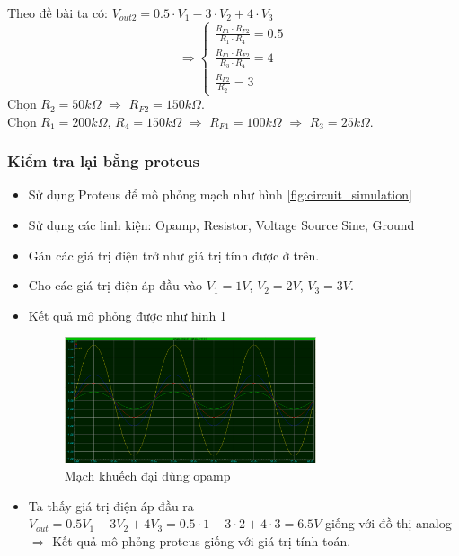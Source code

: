 				\hspace*{0.6cm}Theo đề bài ta có: $V_{out2} = 0.5 \cdot V_1 - 3 \cdot V_2 + 4 \cdot V_3$
				\[
				\Rightarrow
				\begin{cases}
					\frac{R_{F1} \cdot R_{F2}}{R_1 \cdot R_4} = 0.5\\
					\frac{R_{F1} \cdot R_{F2}}{R_3 \cdot R_4} = 4\\
					\frac{R_{F2}}{R_2} = 3
				\end{cases}
				\]
				\hspace*{0.6cm}Chọn $R_{2} = 50k\Omega$ $\Rightarrow$ $R_{F2} = 150k\Omega$.\\
				\hspace*{0.6cm}Chọn $R_{1} = 200k\Omega$, $R_{4} = 150k\Omega$ $\Rightarrow$ $R_{F1} = 100k\Omega$ $\Rightarrow$ $R_3 = 25k\Omega$.\\
			\newpage
			\subsubsection{Kiểm tra lại bằng proteus}
				\begin{itemize}
					\item Sử dụng Proteus để mô phỏng mạch như hình \ref{fig:circuit_simulation}
					\item Sử dụng các linh kiện: Opamp, Resistor, Voltage Source Sine, Ground
					\item Gán các giá trị điện trở như giá trị tính được ở trên.
					\item Cho các giá trị điện áp đầu vào $V_1 = 1V$, $V_2 = 2V$, $V_3 = 3V$.
					\item Kết quả mô phỏng được như hình \ref{fig:result_simulation}
					\begin{figure}[H]
						\centering
						\includegraphics[width=0.7\textwidth]{pictures/result1_a.png}
						\caption{Mạch khuếch đại dùng opamp}					
						\label{fig:result_simulation}
					\end{figure}
					\item Ta thấy giá trị điện áp đầu ra $V_{out} = 0.5V_1 - 3V_2 + 4V_3 = 0.5 \cdot 1 - 3 \cdot 2 + 4 \cdot 3 = 6.5V$ giống với đồ thị analog $\Rightarrow$ Kết quả mô phỏng proteus giống với giá trị tính toán.
				\end{itemize}
